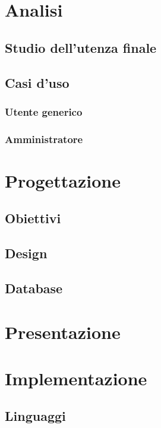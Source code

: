\documentclass[a4paper, dvipsnames, table]{article}
\begin{document}
\newpage
\section{Analisi}
	\subsection{Studio dell'utenza finale}
		
	\subsection{Casi d'uso}
		\subsubsection{Utente generico}
			
		\subsubsection{Amministratore}
			

\newpage
\section{Progettazione}%
	\subsection{Obiettivi}
	\subsection{Design}%
	\subsection{Database}

\newpage
\section{Presentazione}%

\newpage
\section{Implementazione}%
	\subsection{Linguaggi}
\end{document}
